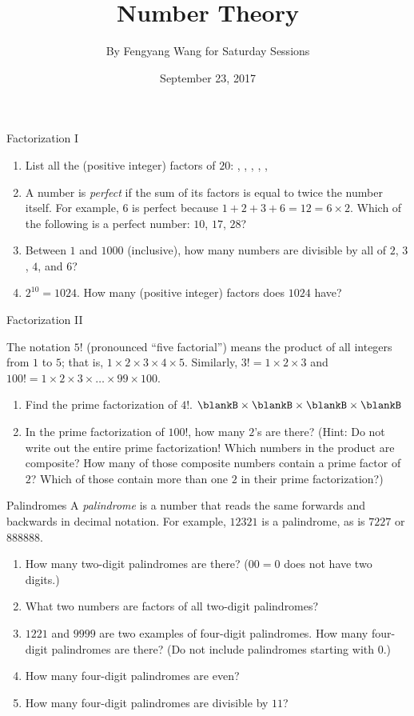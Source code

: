 \documentclass[12pt,letterpaper]{article}
\title{Number Theory}
\author{By Fengyang Wang for Saturday Sessions}
\date{September 23, 2017}
\begin{document}
\HomeworkTitle
\begin{problem}{Factorization I}
  \begin{enumerate}
    \item
    List all the (positive integer) factors of \(20\):
   \blankB, \blankB,
   \blankB, \blankB,
   \blankB, \blankB
   \item
    A number is \emph{perfect} if the sum of its factors is equal to twice the
    number itself. For example, \(6\) is perfect because
    \(1+2+3+6=12=6\times2\). Which of the following is a perfect number:
    \(10\), \(17\), \(28\)?
   \item
   Between \(1\) and \(1000\) (inclusive), how many numbers are divisible by
   all of \(2\), \(3\), \(4\), and \(6\)? 
  \item \(2^{10}=1024\). How many (positive integer) factors does \(1024\)
  have?
 \end{enumerate}
\end{problem}

\begin{problem}{Factorization II}

The notation $5!$ (pronounced ``five factorial'') means the product of all
integers from $1$ to $5$; that is, $1 \times 2 \times 3 \times 4 \times 5$.
Similarly, $3! = 1 \times 2 \times 3$ and $100! = 1 \times 2 \times 3
\times\ldots\times 99 \times 100$.

\begin{enumerate}
 \item Find the prime factorization of $4!$. \hfill
 $\blankB \times \blankB \times \blankB \times \blankB$
 \item In the prime factorization of $100!$, how many $2$'s are there? (Hint:
 Do not write out the entire prime factorization! Which numbers in the product
 are composite? How many of those composite numbers contain a prime factor of
 $2$? Which of those contain more than one $2$ in their prime factorization?)
\end{enumerate}

\end{problem}

\begin{problem}{Palindromes}
 A \emph{palindrome} is a number that reads the same forwards and backwards in
 decimal notation. For example, $12321$ is a palindrome, as is $7227$ or
 $888888$.

 \begin{enumerate}
  \item How many two-digit palindromes are there? ($00=0$ does not have two
  digits.)
  \item What two numbers are factors of all two-digit palindromes?
  \item $1221$ and $9999$ are two examples of four-digit palindromes. How many
  four-digit palindromes are there? (Do not include palindromes starting with
  $0$.)
  \item How many four-digit palindromes are even?
  \item How many four-digit palindromes are divisible by $11$?
\end{enumerate}
\end{problem}
\end{document}
